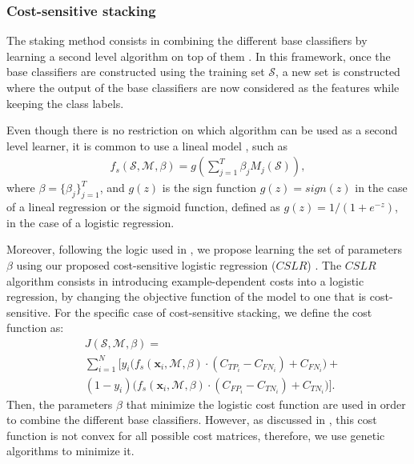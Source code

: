 {  \subsubsection{Cost-sensitive stacking}
  
  The staking method consists in combining the different base classifiers by learning a 
  second level algorithm on top of them \citep{Wolpert1992}. In this framework, once the base 
  classifiers are constructed using the training set  $\mathcal{S}$, a new set is constructed 
  where the output of the base classifiers  are now considered as the features while keeping the 
  class labels.
  
  Even though there is no restriction on which algorithm can be used as a second level learner, 
  it is common to use a lineal model \citep{Zhou2012}, such as 
  \begin{align}
    f_s(\mathcal{S},\mathcal{M},\beta) =
    g \left( \sum_{j=1}^T \beta_j M_j(\mathcal{S}) \right),
  \end{align}
  where $\beta=\{\beta_j\}_{j=1}^T$, and $g(z)$ is the sign function 
  \mbox{$g(z)=sign(z)$} in the case of a lineal regression or the sigmoid function, defined 
  as \mbox{$g(z)=1/(1+e^{-z})$}, in the case of a logistic regression. 
  
  Moreover, following the logic used in \citep{Nesbitt2010}, we propose learning the set of  
  parameters $\beta$  using our proposed cost-sensitive logistic regression ($CSLR$) 
  \citep{CorreaBahnsen2014b}. The $CSLR$ algorithm consists in introducing example-dependent costs 
  into a logistic regression, by changing the objective function of the model to one that is 
  cost-sensitive. For the specific case of cost-sensitive stacking, we define the cost function as: 
  \begin{align}
    &J(\mathcal{S},\mathcal{M},\beta)= \nonumber \\
    & \sum_{i=1}^{N} \bigg[ y_i\bigg( 
    f_s(\mathbf{x}_i,\mathcal{M},\beta) \cdot(C_{TP_i} - C_{FN_i}) + C_{FN_i} \bigg) + 
    \nonumber \\
    & (1-y_i)\bigg( f_s(\mathbf{x}_i,\mathcal{M},\beta) \cdot(C_{FP_i} - C_{TN_i}) 
      +C_{TN_i} \bigg) \bigg].
  \end{align}
  Then, the parameters $\beta$ that minimize the logistic cost function are used in order to 
  combine the different base classifiers. However, as discussed in \citep{CorreaBahnsen2014b}, 
  this cost function is not convex for all possible cost matrices, therefore, we use genetic 
  algorithms to minimize it.
  
}
